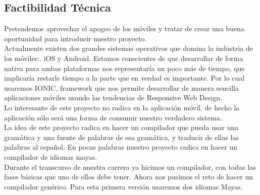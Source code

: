 \documentclass[a4paper,openright,12pt]{article}
\begin{document}
\begin{table}[h]
\caption{Comparativa de Caracter\'isticas}
\end{table}

\subsection{Factibilidad T\'ecnica}
Pretendemos aprovechar el apogeo de los m\'oviles y tratar de crear una buena oportunidad para introducir nuestro proyecto.\\
Actualmente existen dos grandes sistemas operativos que domina la industria de los m\'oviles:. iOS y Android. Estamos conscientes de que desarrollar de forma nativa para ambas plataformas nos representar\'ia un poco m\'as de tiempo, que implicar\'ia restarle tiempo a la parte que en verdad es importante. Por lo cual usaremos IONIC, framework que nos permite desarrollar de manera sencilla aplicaciones m\'oviles usando las tendencias de Responsive Web Design. \\

Lo interesante de este proyecto no radica en la aplicaci\'on m\'ovil, de hecho la aplicaci\'on s\'olo ser\'a una forma de consumir nuestro verdadero sistema.\\

La idea de este proyecto radica en hacer un compilador que pueda usar una gram\'atica y una fuente de palabras de esa gram\'atica, y traducir de ellas las palabras al español. En pocas palabras nuestro proyecto radica en hacer un compilador de idiomas mayas.\\

Durante el transcurso de nuestra carrera ya hicimos un compilador, con todas las fases b\'asicas que uno de ellos debe tener. Ahora nos pusimos el reto de hacer un compilador gen\'erico. Para esta primera versi\'on usaremos dos idiomas Mayas.\\
\end{document}
